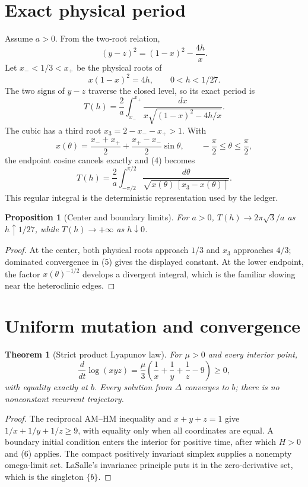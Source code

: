 \documentclass[10pt]{article}
\newtheorem{theorem}{Theorem}
\newtheorem{proposition}{Proposition}
\begin{document}
\section{Exact physical period}
Assume $a>0$.  From the two-root relation,
\[
 (y-z)^2=(1-x)^2-\frac{4h}{x}.
\]
Let $x_-<1/3<x_+$ be the physical roots of
\begin{equation}
 x(1-x)^2=4h,\qquad 0<h<1/27. \tag{3}
\end{equation}
The two signs of $y-z$ traverse the closed level, so its exact period is
\begin{equation}
 T(h)=\frac2a\int_{x_-}^{x_+}
 \frac{dx}{x\sqrt{(1-x)^2-4h/x}}. \tag{4}
\end{equation}
The cubic has a third root $x_3=2-x_--x_+>1$.  With
\[
 x(\theta)=\frac{x_-+x_+}{2}+\frac{x_+-x_-}{2}\sin\theta,
 \qquad -\frac\pi2\le\theta\le\frac\pi2,
\]
the endpoint cosine cancels exactly and (4) becomes
\begin{equation}
 T(h)=\frac2a\int_{-\pi/2}^{\pi/2}
 \frac{d\theta}{\sqrt{x(\theta)\,[x_3-x(\theta)]}}. \tag{5}
\end{equation}
This regular integral is the deterministic representation used by the ledger.

\begin{proposition}[Center and boundary limits]
For $a>0$, $T(h)\to2\pi\sqrt3/a$ as $h\uparrow1/27$, while
$T(h)\to+\infty$ as $h\downarrow0$.
\end{proposition}
\begin{proof}
At the center, both physical roots approach $1/3$ and $x_3$ approaches
$4/3$; dominated convergence in (5) gives the displayed constant.  At the
lower endpoint, the factor $x(\theta)^{-1/2}$ develops a divergent integral,
which is the familiar slowing near the heteroclinic edges.
\end{proof}

\section{Uniform mutation and convergence}
\begin{theorem}[Strict product Lyapunov law]
For $\mu>0$ and every interior point,
\begin{equation}
 \frac{d}{dt}\log(xyz)=\frac\mu3\left(\frac1x+\frac1y+\frac1z-9\right)\ge0, \tag{6}
\end{equation}
with equality exactly at $b$.  Every solution from $\Delta$ converges to $b$;
there is no nonconstant recurrent trajectory.
\end{theorem}
\begin{proof}
The reciprocal AM--HM inequality and $x+y+z=1$ give
$1/x+1/y+1/z\ge9$, with equality only when all coordinates are equal.  A
boundary initial condition enters the interior for positive time, after which
$H>0$ and (6) applies.  The compact positively invariant simplex supplies a
nonempty omega-limit set.  LaSalle's invariance principle puts it in the
zero-derivative set, which is the singleton $\{b\}$.
\end{proof}
\end{document}
